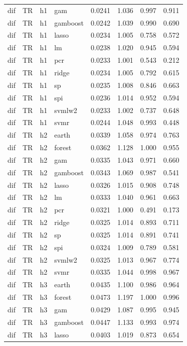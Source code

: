 \begin{ThreePartTable}
\begin{longtable}[t]{llclcccc}
dif & TR & h1 & gam & 0.0241 & 1.036 & 0.997 & 0.911\\
dif & TR & h1 & gamboost & 0.0242 & 1.039 & 0.990 & 0.690\\
dif & TR & h1 & lasso & 0.0234 & 1.005 & 0.758 & 0.572\\
dif & TR & h1 & lm & 0.0238 & 1.020 & 0.945 & 0.594\\
dif & TR & h1 & pcr & 0.0233 & 1.001 & 0.543 & 0.212\\
dif & TR & h1 & ridge & 0.0234 & 1.005 & 0.792 & 0.615\\
dif & TR & h1 & sp & 0.0235 & 1.008 & 0.846 & 0.663\\
dif & TR & h1 & spi & 0.0236 & 1.014 & 0.952 & 0.594\\
dif & TR & h1 & svmlw2 & 0.0233 & 1.002 & 0.737 & 0.648\\
dif & TR & h1 & svmr & 0.0244 & 1.048 & 0.993 & 0.448\\
\addlinespace
dif & TR & h2 & earth & 0.0339 & 1.058 & 0.974 & 0.763\\
dif & TR & h2 & forest & 0.0362 & 1.128 & 1.000 & 0.955\\
dif & TR & h2 & gam & 0.0335 & 1.043 & 0.971 & 0.660\\
dif & TR & h2 & gamboost & 0.0343 & 1.069 & 0.987 & 0.541\\
dif & TR & h2 & lasso & 0.0326 & 1.015 & 0.908 & 0.748\\
dif & TR & h2 & lm & 0.0333 & 1.040 & 0.961 & 0.663\\
dif & TR & h2 & pcr & 0.0321 & 1.000 & 0.491 & 0.173\\
dif & TR & h2 & ridge & 0.0325 & 1.014 & 0.893 & 0.711\\
dif & TR & h2 & sp & 0.0325 & 1.014 & 0.891 & 0.741\\
dif & TR & h2 & spi & 0.0324 & 1.009 & 0.789 & 0.581\\
dif & TR & h2 & svmlw2 & 0.0325 & 1.013 & 0.967 & 0.774\\
dif & TR & h2 & svmr & 0.0335 & 1.044 & 0.998 & 0.967\\
\addlinespace
dif & TR & h3 & earth & 0.0435 & 1.100 & 0.986 & 0.964\\
dif & TR & h3 & forest & 0.0473 & 1.197 & 1.000 & 0.996\\
dif & TR & h3 & gam & 0.0429 & 1.087 & 0.995 & 0.945\\
dif & TR & h3 & gamboost & 0.0447 & 1.133 & 0.993 & 0.974\\
dif & TR & h3 & lasso & 0.0403 & 1.019 & 0.873 & 0.654\\

\end{longtable}
\end{ThreePartTable}
